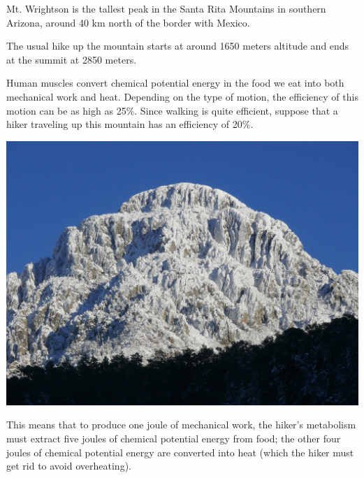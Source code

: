 \documentclass[12pt]{article}
\begin{document}
\newpage


\begin{minipage}{0.4\textwidth}
	
Mt. Wrightson is the tallest peak in the Santa Rita Mountains in southern Arizona, around 40 km north of the border with Mexico.

\bigskip
	
The usual hike up the mountain starts at around 1650 meters altitude and ends at the summit at 2850 meters.
\bigskip



Human muscles convert chemical potential energy in the food we eat into both mechanical work and heat. Depending on the type of motion, the efficiency of this motion can be as high as 25\%. Since walking is quite efficient, suppose that a hiker traveling up this mountain has an efficiency of 20\%. 

\bigskip



\end{minipage}
\hspace{0.05\textwidth}
\begin{minipage}{0.5\textwidth}
\includegraphics[width=\textwidth]{wrightson1024.jpg}
\end{minipage}


This means that to produce one joule of mechanical work, the hiker's metabolism must extract five joules of chemical potential energy from food; the other four joules of chemical potential energy are converted into heat (which the hiker must get rid to avoid overheating).
\end{document}
